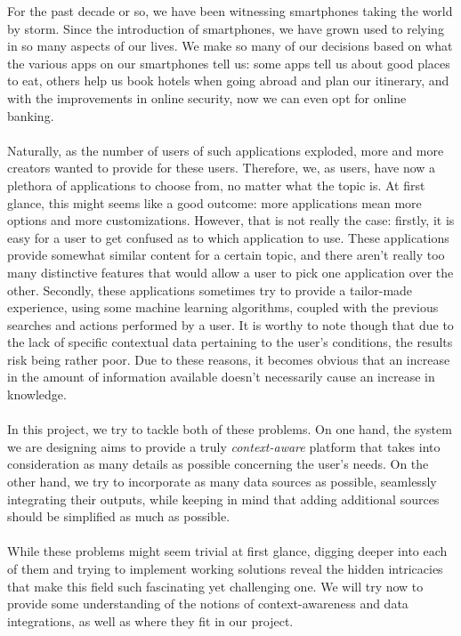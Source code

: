 For the past decade or so, we have been witnessing smartphones taking the world by storm. Since the introduction of smartphones, we have grown used to relying in so many aspects of our lives. We make so many of our decisions based on what the various apps on our smartphones tell us: some apps tell us about good places to eat, others help us book hotels when going abroad and plan our itinerary, and with the improvements in online security, now we can even opt for online banking.\\\\
Naturally, as the number of users of such applications exploded, more and more creators wanted to provide for these users. Therefore, we, as users, have now a plethora of applications to choose from, no matter what the topic is. At first glance, this might seems like a good outcome: more applications mean more options and more customizations. However, that is not really the case: firstly, it is easy for a user to get confused as to which application to use. These applications provide somewhat similar content for a certain topic, and there aren't really too many distinctive features that would allow a user to pick one application over the other. Secondly, these applications sometimes try to provide a tailor-made experience, using some machine learning algorithms, coupled with the previous searches and actions performed by a user. It is worthy to note though that due to the lack of specific contextual data pertaining to the user's conditions, the results risk being rather poor. Due to these reasons, it becomes obvious that an increase in the amount of information available doesn't necessarily cause an increase in knowledge.\\\\
In this project, we try to tackle both of these problems. On one hand, the system we are designing aims to provide a truly \emph{context-aware} platform that takes into consideration as many details as possible concerning the user's needs. On the other hand, we try to incorporate as many data sources as possible, seamlessly integrating their outputs, while keeping in mind that adding additional sources should be simplified as much as possible.\\\\
While these problems might seem trivial at first glance, digging deeper into each of them and trying to implement working solutions reveal the hidden intricacies that make this field such fascinating yet challenging one. We will try now to provide some understanding of the notions of context-awareness and data integrations, as well as where they fit in our project.

